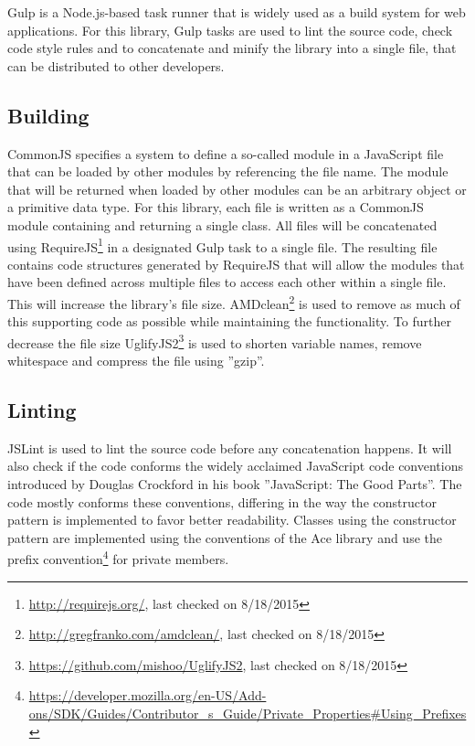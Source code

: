 Gulp is a Node.js-based task runner that is widely used as a build system for web applications. For this library, Gulp tasks are used to lint the source code, check code style rules and to concatenate and minify the library into a single file, that can be distributed to other developers.

\subsection{Building}


CommonJS specifies a system to define a so-called module in a JavaScript file that can be loaded by other modules by referencing the file name. The module that will be returned when loaded by other modules can be an arbitrary object or a primitive data type. For this library, each file is written as a CommonJS module containing and returning a single class. All files will be concatenated using RequireJS\footnote{\url{http://requirejs.org/}, last checked on 8/18/2015} in a designated Gulp task to a single file. The resulting file  contains code structures generated by RequireJS that will allow the modules that have been defined across multiple files to access each other within a single file. This will increase the library's file size. AMDclean\footnote{\url{http://gregfranko.com/amdclean/}, last checked on 8/18/2015} is used to remove as much of this supporting code as possible while maintaining the functionality. To further decrease the file size UglifyJS2\footnote{\url{https://github.com/mishoo/UglifyJS2}, last checked on 8/18/2015} is used to shorten variable names, remove whitespace and compress the file using ''gzip''.


\subsection{Linting}

JSLint is used to lint the source code before any concatenation happens. It will also check if the code conforms the widely acclaimed JavaScript code conventions introduced by Douglas Crockford in his book ''JavaScript: The Good Parts''\cite{crockf}. The code mostly conforms these conventions, differing in the way the constructor pattern is implemented to favor better readability. Classes using the constructor pattern are implemented using the conventions of the Ace library and use the prefix convention\footnote{\url{https://developer.mozilla.org/en-US/Add-ons/SDK/Guides/Contributor\_s\_Guide/Private\_Properties\#Using\_Prefixes}} for private members.


